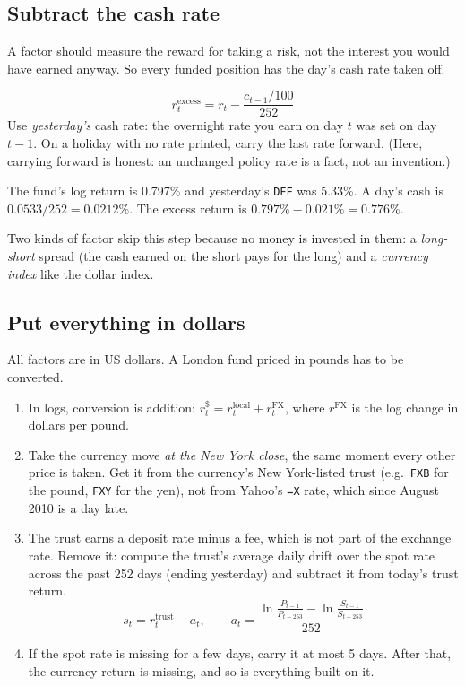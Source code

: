 \documentclass[11pt,a4paper]{article}
\begin{document}
\subsection{Subtract the cash rate}

A factor should measure the reward for taking a risk, not the interest you would
have earned anyway. So every funded position has the day's cash rate taken off.

\begin{method}
\[
  r^{\text{excess}}_t = r_t - \frac{c_{t-1}/100}{252}
\]
Use \emph{yesterday's} cash rate: the overnight rate you earn on day $t$ was set on
day $t-1$. On a holiday with no rate printed, carry the last rate forward. (Here,
carrying forward is honest: an unchanged policy rate is a fact, not an invention.)
\end{method}

\begin{example}
The fund's log return is 0.797\% and yesterday's \texttt{DFF} was 5.33\%. A day's cash is
$0.0533/252 = 0.0212\%$. The excess return is $0.797\% - 0.021\% = 0.776\%$.
\end{example}

Two kinds of factor skip this step because no money is invested in them: a
\emph{long-short} spread (the cash earned on the short pays for the long) and a
\emph{currency index} like the dollar index.

\subsection{Put everything in dollars}

All factors are in US dollars. A London fund priced in pounds has to be converted.

\begin{method}
\begin{enumerate}[leftmargin=1.4em]
  \item In logs, conversion is addition: $r^{\$}_t = r^{\text{local}}_t + r^{\text{FX}}_t$, where $r^{\text{FX}}$ is the log change in dollars per pound.
  \item Take the currency move \emph{at the New York close}, the same moment every other price is taken. Get it from the currency's New York-listed trust (e.g.\ \texttt{FXB} for the pound, \texttt{FXY} for the yen), not from Yahoo's \texttt{=X} rate, which since August 2010 is a day late.
  \item The trust earns a deposit rate minus a fee, which is not part of the exchange rate. Remove it: compute the trust's average daily drift over the spot rate across the past 252 days (ending yesterday) and subtract it from today's trust return.
  \[
    s_t = r^{\text{trust}}_t - a_t,\qquad
    a_t = \frac{\ln\frac{P_{t-1}}{P_{t-253}} - \ln\frac{S_{t-1}}{S_{t-253}}}{252}
  \]
  \item If the spot rate is missing for a few days, carry it at most 5 days. After that, the currency return is missing, and so is everything built on it.
\end{enumerate}
\end{method}
\end{document}
